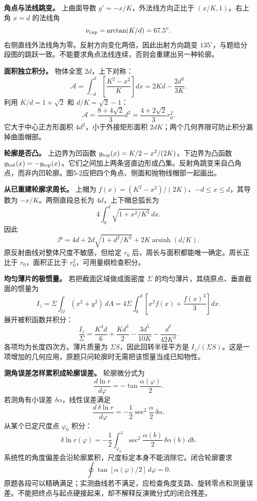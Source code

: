 \documentclass[12pt,a4paper,UTF8]{ctexart}
\begin{document}
\textbf{角点与法线跳变。} 上曲面导数 \(y'=-x/K\)，外法线方向正比于
\((x/K,1)\)。右上角 \(x=d\) 的法线角 \[
\nu_{\rm cap}=\arctan(K/d)=67.5^\circ.
\] 右侧直线外法线角为零。反射方向变化两倍，因此出射方向跳变
\(135^\circ\)，与题给分段图的跳跃一致。不能要求角点法线连续，否则会重建出另一种轮廓。

\textbf{面积独立积分。} 物体全宽 \(2d\)，上下对称： \[
\mathcal A=\int_{-d}^d
\left[\frac{K^2-x^2}{K}\right]dx
=2Kd-\frac{2d^3}{3K}.
\] 利用 \(K/d=1+\sqrt2\) 和 \(d/K=\sqrt2-1\)： \[
\boxed{\mathcal A=\frac{8+4\sqrt2}{3}d^2
=\frac{4+2\sqrt2}{3}r_0^2}.
\] 它大于中心正方形面积 \(4d^2\)，小于外接矩形面积
\(2dK\)；两个几何界限可防止积分漏掉曲面帽部。

\textbf{轮廓是否凸。} 上边界为凹函数
\(y_{\rm top}(x)=K/2-x^2/(2K)\)，下边界为凸函数
\(y_{\rm bot}(x)=-y_{\rm top}(x)\)。它们之间加上两条竖直边形成凸集。反射角跳变来自凸角点，而非内凹轮廓。图5-2应把四个角点、侧面和抛物线帽部一起画出。

\textbf{从已重建轮廓求周长。} 上帽为
\(f(x)=(K^2-x^2)/(2K)\)、\(-d\le x\le d\)，其导数为
\(-x/K\)。两侧直段总长为 \(4d\)，上下帽总弧长为 \[
4\int_0^d\sqrt{1+x^2/K^2}\,dx.
\] 因此 \[
\boxed{\mathcal P=
4d+2d\sqrt{1+d^2/K^2}+2K\operatorname{arsinh}(d/K)}.
\] 原反射曲线对整体尺度不敏感，但给定 \(r_0\)
后，周长与面积都能唯一确定。周长正比于 \(r_0\)，面积正比于
\(r_0^2\)，可用量纲检查积分。

\textbf{均匀薄片的极惯量。} 若把截面区域做成面密度 \(\Sigma\)
的均匀薄片，其绕原点、垂直截面的惯量为 \[
I_z=\Sigma\int_\Omega(x^2+y^2)\,dA
=4\Sigma\int_0^d\left[x^2f(x)+\frac{f(x)^3}{3}\right]dx.
\] 展开被积函数并积分： \[
\boxed{\frac{I_z}{\Sigma}
=\frac{K^3d}{6}+\frac{Kd^3}{2}
-\frac{3d^5}{10K}-\frac{d^7}{42K^3}}.
\] 各项均为长度四次方。薄片质量为 \(\Sigma S\)，因此回转半径平方是
\(I_z/(\Sigma S)\)。这是一项增加的几何应用，原题只问轮廓时无需把该惯量当成已知物性。

\textbf{测角误差怎样累积成轮廓误差。} 轮廓微分式为 \[
\frac{d\ln r}{d\varphi}=-\tan\frac{\alpha(\varphi)}2.
\] 若测角有小误差 \(\delta\alpha\)，线性误差满足 \[
\frac{d\,\delta\ln r}{d\varphi}
=-\frac12\sec^2\frac{\alpha}{2}\,\delta\alpha.
\] 从某个已定尺度点 \(\varphi_0\) 积分： \[
\delta\ln r(\varphi)=
-\frac12\int_{\varphi_0}^{\varphi}
\sec^2\frac{\alpha(b)}2\,\delta\alpha(b)\,db.
\] 系统性的角度偏差会沿轮廓累积，尺度标定本身不能消除它。闭合轮廓要求 \[
\boxed{\oint\tan[\alpha(\varphi)/2]\,d\varphi=0}.
\]
原题各段可以精确满足；实测曲线若不满足，应检查角度支路、旋转零点和测量误差。不能把终点与起点硬接起来，却不解释反演微分式的闭合残差。
\end{document}
